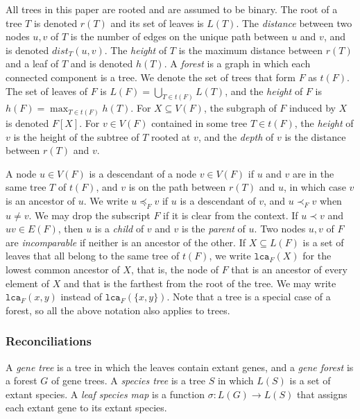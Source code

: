\documentclass[10pt]{article}
\newcommand{\lca}{\texttt{lca}}
\begin{document}
All trees in this paper are rooted and are assumed to be binary.  The root of a tree $T$ is denoted $r(T)$ and its set of leaves is $L(T)$.  The \emph{distance} between two nodes $u, v$ of $T$ is the number of edges on the unique path between $u$ and $v$, and is denoted $dist_T(u, v)$.  
The \emph{height} of $T$ is the maximum distance between $r(T)$ and a leaf of $T$ and is denoted $h(T)$.
A \emph{forest} is a graph in which each connected component is a tree.  We denote the set of trees that form $F$ as $t(F)$.  The set of leaves of $F$ is $L(F) = \bigcup_{T \in t(F)} L(T)$, and the \emph{height} of $F$ is $h(F) = \max_{T \in t(F)} h(T)$.
For $X \subseteq V(F)$, the subgraph of $F$ induced by $X$ is denoted $F[X]$.
For $v \in V(F)$ contained in some tree $T \in t(F)$, the \emph{height} of $v$ is the height of the subtree of $T$ rooted at $v$, and the \emph{depth} of $v$ is the distance between $r(T)$ and $v$.


A node $u \in V(F)$ is a descendant of a node $v \in V(F)$ if $u$ and $v$ are in the same tree $T$ of $t(F)$, and $v$ is on the path between $r(T)$ and $u$, in which case $v$ is an ancestor of $u$.  We write $u \preceq_F v$ if $u$ is a descendant of $v$, and $u \prec_F v$ when $u \neq v$.  We may drop the subscript $F$ if it is clear from the context.  If $u \prec v$ and $uv \in E(F)$, then $u$ is a \emph{child} of $v$ and $v$ is the \emph{parent} of $u$.  
Two nodes $u, v$ of $F$ are \emph{incomparable} if neither is an ancestor of the other.
If $X \subseteq L(F)$ is a set of leaves that all belong to the same tree of $t(F)$, we write $\lca_F(X)$ for the lowest common ancestor of $X$, that is, the node of $F$ that is an ancestor of every element of $X$ and that is the farthest from the root of the tree.  We may write $\lca_F(x, y)$ instead of $\lca_F(\{x, y\})$.
Note that a tree is a special case of a forest, so all the above notation also applies to trees.



\subsubsection*{Reconciliations}

A \emph{gene tree} is a tree in which the leaves contain extant genes, and 
a \emph{gene forest} is a forest $G$ of gene trees.  A \emph{species tree} is a tree $S$ in which $L(S)$ is a set of extant species. 
A \emph{leaf species map} is a function $\sigma : L(G) \rightarrow L(S)$ that assigns each extant gene to its extant species.
\end{document}

